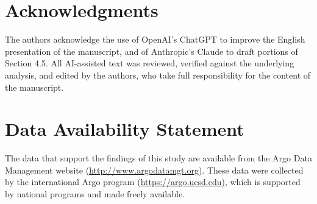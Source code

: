 \documentclass[11pt]{article}
\theoremstyle{plain}
\begin{document}
\section*{Acknowledgments}
The authors acknowledge the use of OpenAI's ChatGPT to improve the English
presentation of the manuscript, and of Anthropic's Claude to draft portions of
Section 4.5. All AI-assisted text was reviewed, verified against the underlying
analysis, and edited by the authors, who take full responsibility for the
content of the manuscript.


\section*{Data Availability Statement}
The data that support the findings of this study are available from the Argo Data Management website (\url{http://www.argodatamgt.org}). These data were collected by the international Argo program (\url{https://argo.ucsd.edu}), which is supported by national programs and made freely available.







\end{document}
